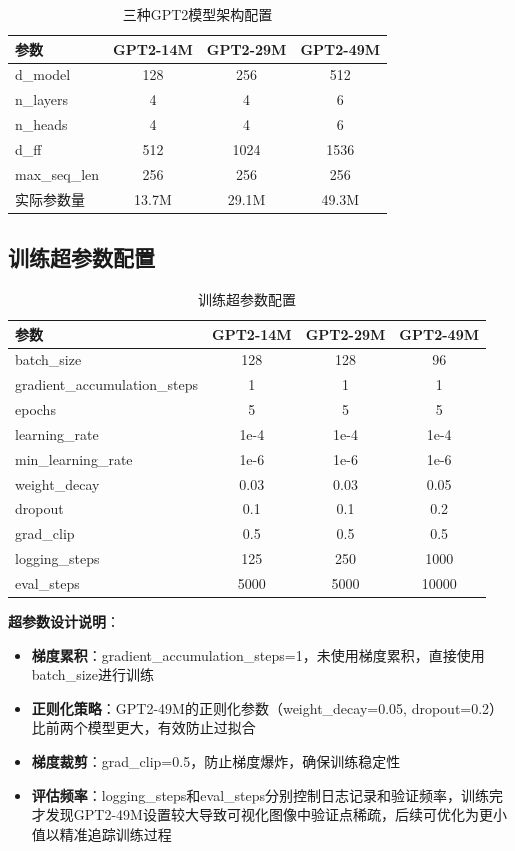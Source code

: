\documentclass{article}
\begin{document}
\begin{table}[h]
\centering
\caption{三种GPT2模型架构配置}
\begin{tabular}{lccc}
\toprule
\textbf{参数} & \textbf{GPT2-14M} & \textbf{GPT2-29M} & \textbf{GPT2-49M} \\
\midrule
d\_model & 128 & 256 & 512 \\
n\_layers & 4 & 4 & 6 \\
n\_heads & 4 & 4 & 6 \\
d\_ff & 512 & 1024 & 1536 \\
max\_seq\_len & 256 & 256 & 256 \\
实际参数量 & 13.7M & 29.1M & 49.3M \\
\bottomrule
\end{tabular}
\end{table}

\subsection{训练超参数配置}
\begin{table}[h]
\centering
\caption{训练超参数配置}
\begin{tabular}{lccc}
\toprule
\textbf{参数} & \textbf{GPT2-14M} & \textbf{GPT2-29M} & \textbf{GPT2-49M} \\
\midrule
batch\_size & 128 & 128 & 96 \\
gradient\_accumulation\_steps & 1 & 1 & 1 \\
epochs & 5 & 5 & 5 \\
learning\_rate & 1e-4 & 1e-4 & 1e-4 \\
min\_learning\_rate & 1e-6 & 1e-6 & 1e-6 \\
weight\_decay & 0.03 & 0.03 & 0.05 \\
dropout & 0.1 & 0.1 & 0.2 \\
grad\_clip & 0.5 & 0.5 & 0.5 \\
logging\_steps & 125 & 250 & 1000 \\
eval\_steps & 5000 & 5000 & 10000 \\
\bottomrule
\end{tabular}
\end{table}

\textbf{超参数设计说明}：
\begin{itemize}
    \item \textbf{梯度累积}：gradient\_accumulation\_steps=1，未使用梯度累积，直接使用batch\_size进行训练
    \item \textbf{正则化策略}：GPT2-49M的正则化参数（weight\_decay=0.05, dropout=0.2）比前两个模型更大，有效防止过拟合
    \item \textbf{梯度裁剪}：grad\_clip=0.5，防止梯度爆炸，确保训练稳定性
    \item \textbf{评估频率}：logging\_steps和eval\_steps分别控制日志记录和验证频率，训练完才发现GPT2-49M设置较大导致可视化图像中验证点稀疏，后续可优化为更小值以精准追踪训练过程
\end{itemize}
\end{document}
